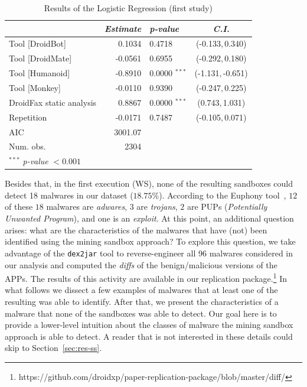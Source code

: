 \begin{table}[ht]
  \centering
     \caption{Results of the Logistic Regression (first study)} 
       \begin{small}
     \begin{tabular}{lrlc}
   \toprule
  & \emph{Estimate} & \emph{p-value} & \emph{C.I.} \\ 
   \midrule
   Tool [DroidBot] & 0.1034 & 0.4718 & (-0.133$, $0.340) \\ 
   Tool [DroidMate] & -0.0561 & 0.6955 & (-0.292$, $0.180) \\ 
   Tool [Humanoid] & -0.8910  & 0.0000 $^{***}$ & (-1.131$, $-0.651) \\ 
   Tool [Monkey] & -0.0110 & 0.9390 &  (-0.247$, $0.225)\\ 
   DroidFax static analysis & 0.8867 & 0.0000 $^{***}$ & (0.743$, $1.031)\\ 
   Repetition & -0.0171 & 0.7487 & (-0.105$, $0.071) \\ \midrule
   AIC            & 3001.07     \\
   Num. obs.      & 2304        \\
   \bottomrule
   \multicolumn{4}{l}{\scriptsize{$^{***}$ \emph{p-value} $<0.001$}}
     \end{tabular}
        \end{small}
    \label{tab:log-reg1} 
\end{table}


Besides that, in the first execution (WS), none of the
resulting sandboxes could detect 18 malwares in our dataset ($18.75$\%). According to
the Euphony tool~\cite{hurier2017euphony}, $12$ of these $18$ malwares are \emph{adwares}, $3$ are \emph{trojans}, $2$ are
PUPs (\emph{Potentially Unwanted Program}), and one is an \emph{exploit}.
At this point, an additional question arises: what are the characteristics
of the malwares that have (not) been identified using the mining sandbox approach?
To explore this question, we take advantage of the
\texttt{dex2jar} tool to reverse-engineer all 96 malwares considered in our analysis and
computed the \emph{diffs} of the benign/malicious versions of the APPs.
The results of this activity are available in our replication
package.\footnote{https://github.com/droidxp/paper-replication-package/blob/master/diff/} 
In what follows we dissect a few examples of malwares
that at least one of the resulting  was able to
identify. After that,
we present the characteristics of a malware that none of the sandboxes
was able to detect. Our goal here is to provide
a lower-level intuition about the classes of malware the
mining sandbox approach is able to detect. A reader that
is not interested in these details could skip to
Section~\ref{sec:res-ss}.

